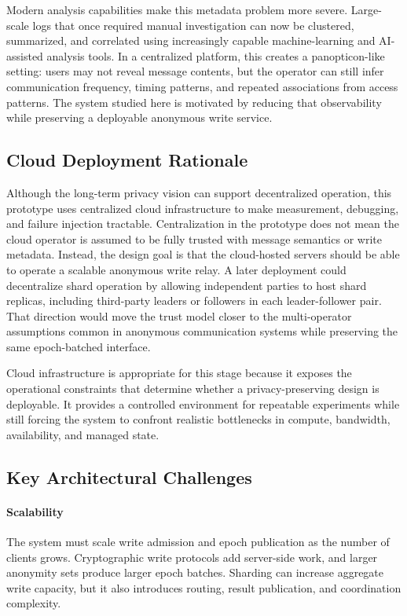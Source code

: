 \documentclass[conference]{IEEEtran}
\begin{document}
Modern analysis capabilities make this metadata problem more severe. Large-scale logs that once required manual investigation can now be clustered, summarized, and correlated using increasingly capable machine-learning and AI-assisted analysis tools. In a centralized platform, this creates a panopticon-like setting: users may not reveal message contents, but the operator can still infer communication frequency, timing patterns, and repeated associations from access patterns. The system studied here is motivated by reducing that observability while preserving a deployable anonymous write service.

\subsection{Cloud Deployment Rationale}

Although the long-term privacy vision can support decentralized operation, this prototype uses centralized cloud infrastructure to make measurement, debugging, and failure injection tractable. Centralization in the prototype does not mean the cloud operator is assumed to be fully trusted with message semantics or write metadata. Instead, the design goal is that the cloud-hosted servers should be able to operate a scalable anonymous write relay. A later deployment could decentralize shard operation by allowing independent parties to host shard replicas, including third-party leaders or followers in each leader-follower pair. That direction would move the trust model closer to the multi-operator assumptions common in anonymous communication systems while preserving the same epoch-batched interface.

Cloud infrastructure is appropriate for this stage because it exposes the operational constraints that determine whether a privacy-preserving design is deployable. It provides a controlled environment for repeatable experiments while still forcing the system to confront realistic bottlenecks in compute, bandwidth, availability, and managed state.

\subsection{Key Architectural Challenges}

\paragraph{Scalability}
The system must scale write admission and epoch publication as the number of clients grows. Cryptographic write protocols add server-side work, and larger anonymity sets produce larger epoch batches. Sharding can increase aggregate write capacity, but it also introduces routing, result publication, and coordination complexity.
\end{document}
